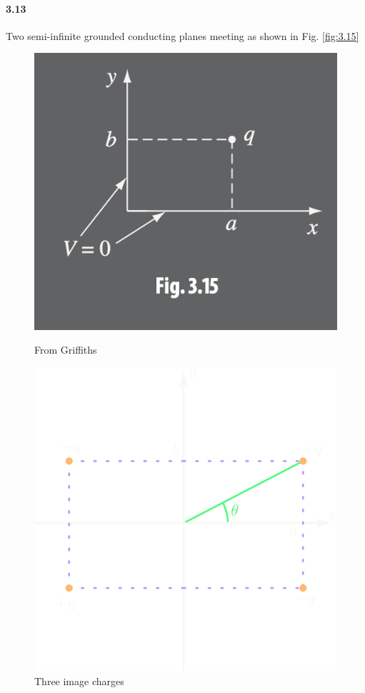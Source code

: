 \documentclass[../main.tex]{subfiles}
\begin{document}
\paragraph{3.13} Two semi-infinite grounded conducting planes meeting as shown in Fig. \ref{fig:3.15}
\begin{figure}[ht]
    \centering
    \begin{minipage}{0.45\linewidth}
        \centering
        \includegraphics[width=\linewidth]{hw3_15.png}
        \caption{From Griffiths}
        \label{fig:3.15}
    \end{minipage}
    \hfill
    \begin{minipage}{0.45\linewidth}
        \centering
        \includegraphics[width=\linewidth]{fig3_15b.png}
        \caption{Three image charges}
        \label{fig:3.15b}
    \end{minipage}
\end{figure}
\end{document}
